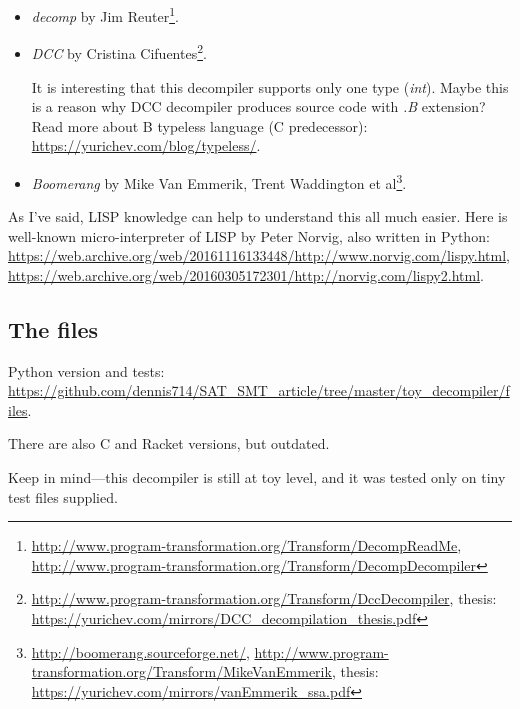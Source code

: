 \begin{itemize}
	\item \textit{decomp} by Jim Reuter\footnote{
			\url{http://www.program-transformation.org/Transform/DecompReadMe},
			\url{http://www.program-transformation.org/Transform/DecompDecompiler}}.

	\item \textit{DCC} by Cristina Cifuentes\footnote{
			\url{http://www.program-transformation.org/Transform/DccDecompiler},
			thesis: \url{https://yurichev.com/mirrors/DCC_decompilation_thesis.pdf}}.

		It is interesting that this decompiler supports only one type (\textit{int}).
		Maybe this is a reason why DCC decompiler produces source code with \textit{.B} extension?
		Read more about B typeless language (C predecessor): \url{https://yurichev.com/blog/typeless/}.

	\item \textit{Boomerang} by Mike Van Emmerik, Trent Waddington et al\footnote{
			\url{http://boomerang.sourceforge.net/},
			\url{http://www.program-transformation.org/Transform/MikeVanEmmerik},
			thesis: \url{https://yurichev.com/mirrors/vanEmmerik_ssa.pdf}}.
\end{itemize}

As I've said, LISP knowledge can help to understand this all much easier.
Here is well-known micro-interpreter of LISP by Peter Norvig, also written in Python:
\url{https://web.archive.org/web/20161116133448/http://www.norvig.com/lispy.html},
\url{https://web.archive.org/web/20160305172301/http://norvig.com/lispy2.html}.

\subsection{The files}

Python version and tests: \url{https://github.com/dennis714/SAT_SMT_article/tree/master/toy_decompiler/files}.

There are also C and Racket versions, but outdated.

Keep in mind---this decompiler is still at toy level, and it was tested only on tiny test files supplied.

